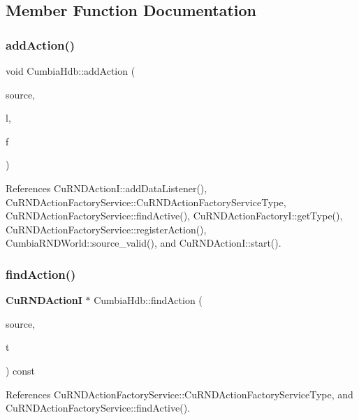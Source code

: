 \subsection{Member Function Documentation}
\mbox{\label{classCumbiaHdb_a494844de57dd03c99b2cd763d3b4995e}} 
\subsubsection{addAction()}
{\footnotesize\ttfamily void Cumbia\+Hdb\+::add\+Action (\begin{DoxyParamCaption}\item[{const std\+::string \&}]{source,  }\item[{Cu\+Data\+Listener $\ast$}]{l,  }\item[{const \textbf{ Cu\+R\+N\+D\+Action\+FactoryI} \&}]{f }\end{DoxyParamCaption})}



References Cu\+R\+N\+D\+Action\+I\+::add\+Data\+Listener(), Cu\+R\+N\+D\+Action\+Factory\+Service\+::\+Cu\+R\+N\+D\+Action\+Factory\+Service\+Type, Cu\+R\+N\+D\+Action\+Factory\+Service\+::find\+Active(), Cu\+R\+N\+D\+Action\+Factory\+I\+::get\+Type(), Cu\+R\+N\+D\+Action\+Factory\+Service\+::register\+Action(), Cumbia\+R\+N\+D\+World\+::source\+\_\+valid(), and Cu\+R\+N\+D\+Action\+I\+::start().

\mbox{\label{classCumbiaHdb_a0779f2c8e25bbedf29b57697e55e5cdb}} 
\subsubsection{findAction()}
{\footnotesize\ttfamily \textbf{ Cu\+R\+N\+D\+ActionI} $\ast$ Cumbia\+Hdb\+::find\+Action (\begin{DoxyParamCaption}\item[{const std\+::string \&}]{source,  }\item[{\textbf{ Cu\+R\+N\+D\+Action\+I\+::\+Type}}]{t }\end{DoxyParamCaption}) const}



References Cu\+R\+N\+D\+Action\+Factory\+Service\+::\+Cu\+R\+N\+D\+Action\+Factory\+Service\+Type, and Cu\+R\+N\+D\+Action\+Factory\+Service\+::find\+Active().

\mbox{\label{classCumbiaHdb_af161b258e5759f7c9b957d39c830bb27}} 

